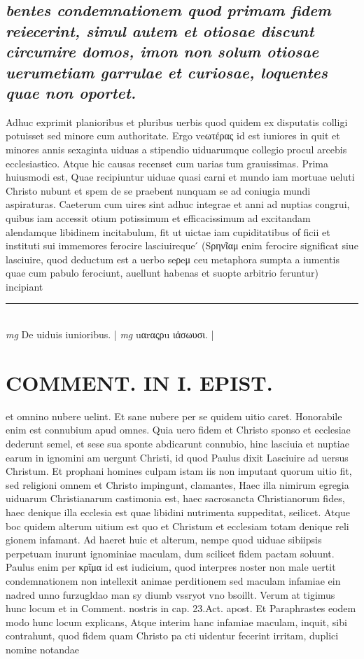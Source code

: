 \documentclass{article}
\begin{document}
\begin{pages}
\subsection*{\textit{bentes condemnationem quod primam fidem reiecerint, simul autem et otiosae discunt circumire domos, imon non solum otiosae uerumetiam garrulae et curiosae, loquentes quae non oportet. }}\pstart Adhuc exprimit planioribus et pluribus uerbis quod quidem ex disputatis colligi potuisset sed minore cum authoritate. Ergo veωτέρας id est iuniores in quit et minores annis sexaginta uiduas a stipendio uiduarumque collegio procul arcebis ecclesiastico. Atque  hic causas recenset cum uarias tum grauissimas. Prima huiusmodi est, Quae recipiuntur uiduae quasi carni et mundo iam mortuae ueluti Christo nubunt et spem de se praebent nunquam se ad coniugia mundi aspiraturas. Caeterum cum uires sint adhuc integrae et anni ad nuptias congrui, quibus iam accessit otium potissimum et efficacissimum ad excitandam alendamque libidinem incitabulum, fit ut uictae iam cupiditatibus of ficii et instituti sui immemores ferocire lasciuireque ́ (Sρηνῖαμ enim ferocire significat siue lasciuire, quod deductum est a uerbo seρeμ ceu metaphora sumpta a iumentis quae cum pabulo ferociunt, auellunt habenas et suopte arbitrio feruntur) incipiant  \pend
\vspace{0.5cm}\noindent
\vspace{0.2cm}\rule{1cm}{0.2pt}\\ 
\hspace{0.2cm}\textit{mg}
\footnotesize De uiduis iunioribus. 
\normalsize| 
\hspace{0.2cm}\textit{mg}
\footnotesize uαrαςρu ιἁσωυσι. 
\normalsize| 
\section*{COMMENT. IN I. EPIST. }\pstart et omnino nubere uelint. Et sane nubere per se quidem uitio caret. Honorabile enim est connubium apud omnes. Quia uero fidem et Christo sponso et ecclesiae dederunt semel, et sese sua sponte abdicarunt connubio, hinc lasciuia et nuptiae earum in ignomini am uergunt Christi, id quod Paulus dixit Lasciuire ad uersus Christum. Et prophani homines culpam istam iis non imputant quorum uitio fit, sed religioni omnem et Christo impingunt, clamantes, Haec illa nimirum egregia uiduarum Christianarum castimonia est, haec sacrosancta Christianorum fides, haec denique illa ecclesia est quae libidini nutrimenta suppeditat, seilicet. Atque boc quidem alterum uitium est quo et Christum et ecclesiam totam denique reli gionem infamant. Ad haeret huic et alterum, nempe quod uiduae sibiipsis perpetuam inurunt ignominiae maculam, dum scilicet fidem pactam soluunt. Paulus enim per κρῖμα id est iudicium, quod interpres noster non male uertit condemnationem non intellexit animae perditionem sed maculam infamiae ein nadred unno furzugldao man sy diumb vssryot vno bsoillt. Verum at tigimus hunc locum et in Comment. nostris in cap. 23.Act. apost. Et Paraphrastes eodem modo hunc locum explicans, Atque interim hanc infamiae maculam, inquit, sibi contrahunt, quod fidem quam Christo pa cti uidentur fecerint irritam, duplici nomine notandae  \pend

\end{pages}
\end{document}
